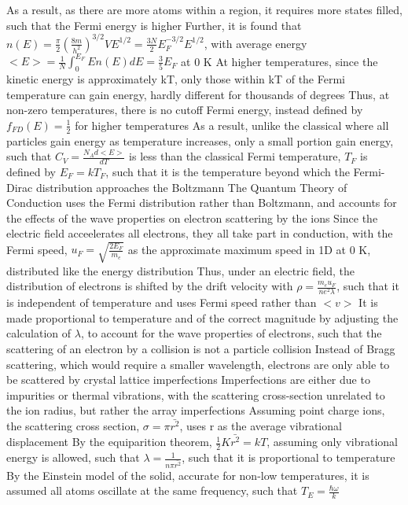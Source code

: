\documentclass[11 pt, twoside]{article}
\newenvironment{outline*}
{
	\begin{outline}[enumerate]
	}
	{\end{outline}
}
\begin{document}
\begin{outline*}
		\3 As a result, as there are more atoms within a region, it requires more states filled, such that the Fermi energy is higher
		\3 Further, it is found that $n(E) = \frac{\pi}{2}(\frac{8m}{h^2})^{3/2}VE^{1/2} = \frac{3N}{2}E_F^{-3/2}E^{1/2}$, with average energy $<E> = \frac{1}{N}\int^{E_F}_0 En(E)dE = \frac{3}{5}E_F$ at 0 K
			\4 At higher temperatures, since the kinetic energy is approximately kT, only those within kT of the Fermi temperature can gain energy, hardly different for thousands of degrees
			\4 Thus, at non-zero temperatures, there is no cutoff Fermi energy, instead defined by $f_{FD}(E) = \frac{1}{2}$ for higher temperatures
			\4 As a result, unlike the classical where all particles gain energy as temperature increases, only a small portion gain energy, such that $C_V = \frac{N_Ad<E>}{dT}$ is less than the classical
	\2 Fermi temperature, $T_F$ is defined by $E_F = kT_F$, such that it is the temperature beyond which the Fermi-Dirac distribution approaches the Boltzmann
\1 The Quantum Theory of Conduction uses the Fermi distribution rather than Boltzmann, and accounts for the effects of the wave properties on electron scattering by the ions
	\2 Since the electric field acceelerates all electrons, they all take part in conduction, with the Fermi speed, $u_F = \sqrt{\frac{2E_F}{m_e}}$ as the approximate maximum speed in 1D at 0 K, distributed like the energy distribution
		\3 Thus, under an electric field, the distribution of electrons is shifted by the drift velocity with $\rho = \frac{m_eu_F}{ne^2\lambda}$, such that it is independent of temperature and uses Fermi speed rather than $<v>$
	\2 It is made proportional to temperature and of the correct magnitude by adjusting the calculation of $\lambda$, to account for the wave properties of electrons, such that the scattering of an electron by a collision is not a particle collision
		\3 Instead of Bragg scattering, which would require a smaller wavelength, electrons are only able to be scattered by crystal lattice imperfections
		\3 Imperfections are either due to impurities or thermal vibrations, with the scattering cross-section unrelated to the ion radius, but rather the array imperfections
			\4 Assuming point charge ions, the scattering cross section, $\sigma = \pi \bar{r^2}$, uses r as the average vibrational displacement
			\4 By the equiparition theorem, $\frac{1}{2}K\bar{r^2} = kT$, assuming only vibrational energy is allowed, such that $\lambda = \frac{1}{n\pi\bar{r^2}}$, such that it is proportional to temperature
		\3 By the Einstein model of the solid, accurate for non-low temperatures, it is assumed all atoms oscillate at the same frequency, such that $T_E = \frac{\hbar\omega}{k}$

\end{outline*}
\end{document}
